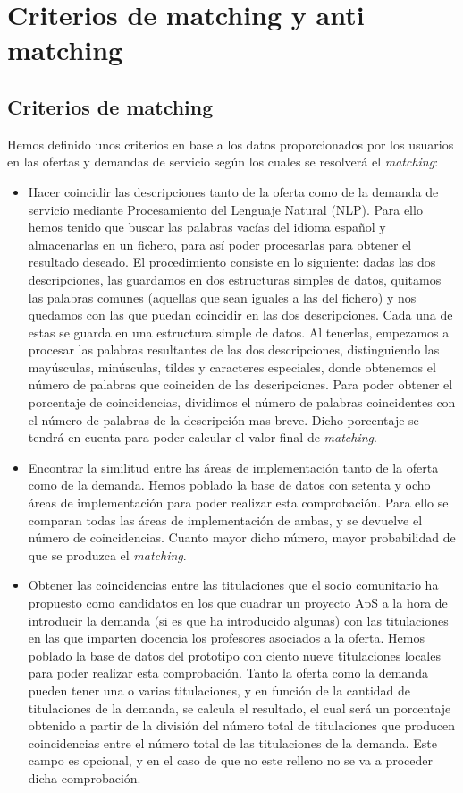 \documentclass[11pt]{book}
\begin{document}
\section{Criterios de matching y anti matching}
\subsection{Criterios de matching }
Hemos definido unos criterios en base a los datos proporcionados por los usuarios en las ofertas y demandas de servicio según los cuales se resolverá el \emph{matching}:
\begin{itemize} 	
	\item Hacer coincidir las descripciones tanto de la oferta como de la demanda de servicio mediante Procesamiento del Lenguaje Natural (NLP).
	Para ello hemos tenido que buscar las palabras vacías del idioma español y almacenarlas en un fichero, para así poder  procesarlas para obtener el resultado deseado. El procedimiento consiste en lo siguiente: dadas las dos descripciones, las guardamos en dos estructuras simples de datos, quitamos las palabras comunes (aquellas que sean iguales a las del fichero) y nos quedamos con las que puedan coincidir en las dos descripciones. Cada una de estas se guarda en una estructura simple de datos. Al tenerlas, empezamos a procesar las palabras resultantes de las dos descripciones, distinguiendo las mayúsculas, minúsculas, tildes y caracteres especiales, donde obtenemos el número de palabras que coinciden de las descripciones. Para poder obtener el porcentaje de coincidencias, dividimos el número de palabras coincidentes con el número de palabras de la descripción mas breve. Dicho porcentaje se tendrá en cuenta para poder calcular el valor final de \emph{matching}.
	\item Encontrar la similitud entre las áreas de implementación tanto de la oferta como de la demanda. Hemos poblado la base de datos con setenta y ocho áreas de implementación para poder realizar esta comprobación. Para ello se comparan todas las áreas de implementación de ambas, y se devuelve el número de coincidencias. Cuanto mayor dicho número, mayor probabilidad de que se produzca el \emph{matching}.
	\item Obtener las coincidencias entre las titulaciones que el socio
	comunitario ha propuesto como candidatos en los que cuadrar un proyecto
	ApS a la hora de introducir la demanda (si es que ha introducido algunas) con las titulaciones en las que imparten docencia los profesores asociados a la oferta. 
	Hemos poblado la base de datos del prototipo con ciento nueve titulaciones locales para poder realizar esta comprobación. Tanto la oferta como la demanda pueden tener una o varias titulaciones, y en función de la cantidad de titulaciones de la demanda, se calcula el resultado, el cual será un porcentaje obtenido a partir de la división del número total de titulaciones que producen coincidencias entre el  número total de las titulaciones de la demanda. Este campo es opcional, y en el caso de que no este relleno no se va a proceder dicha comprobación.

\end{itemize}
\end{document}
